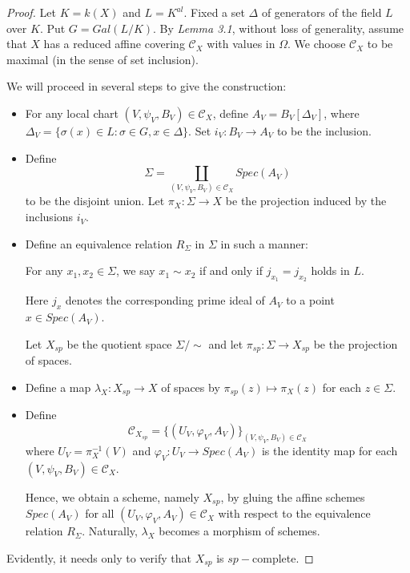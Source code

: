 \documentclass[12pt,twoside,reqno]{amsart}
\theoremstyle{definition}
\numberwithin{equation}{section}
\begin{document}
\begin{proof}
Let $K=k\left( X\right) $ and $L=K^{al}$. Fixed a set $\Delta $ of generators of the field $L$
over $K$. Put $G=Gal\left( L/K\right) .$
By \emph{Lemma 3.1}, without loss of generality, assume that $X$ has a reduced affine covering $\mathcal{C}_{X}$ with values in $\Omega .$
We choose $\mathcal{C}_{X}$ to be maximal (in the sense of set inclusion).

We will proceed in several steps to give the construction:
\begin{itemize}
\item For any local chart $\left( V,\psi
_{V},B_{V}\right) \in \mathcal{C}_{X}$, define $A_{V}=B_{V}\left[ \Delta _{V}\right] $, where
$
\Delta _{V}=\{\sigma \left( x\right) \in L:\sigma \in G,x\in \Delta \}.
$
Set $i_{V}:B_{V}\rightarrow A_{V}$ to be the inclusion.

\item Define
$$
\Sigma =\coprod\limits_{\left( V,\psi _{V},B_{V}\right) \in \mathcal{C}
_{X}}Spec\left( A_{V}\right)
$$
to be the disjoint union. Let $\pi _{X}:\Sigma \rightarrow X$ be the
projection induced by the inclusions $i_{V}$.

\item Define an equivalence relation $R_{\Sigma }$ in $
\Sigma $ in such a manner:

For any $x_{1},x_{2}\in \Sigma $, we say $x_{1}\sim x_{2}$ if and only if $
j_{x_{1}}=j_{x_{2}}$ holds in $L$.

Here $j_{x}$ denotes the corresponding
prime ideal of $A_{V}$ to a point $x\in Spec\left( A_{V}\right) $.

Let $ X_{sp}$ be the quotient space $\Sigma /\sim $ and let $\pi_{sp}:\Sigma \rightarrow  X_{sp}$ be the
projection of spaces.


\item Define a map $\lambda_{X}:X_{sp}\rightarrow X$ of spaces  by
$
\pi_{sp}\left( z\right) \longmapsto \pi _{X}\left( z\right)
$
for each $z\in \Sigma $.

\item Define
\begin{equation*}
\mathcal{C}_{X_{sp}}=\{\left( U_{V},\varphi _{V},A_{V}\right) \}_{\left( V,\psi
_{V},B_{V}\right) \in \mathcal{C}_{X}}
\end{equation*}%
where $U_{V}=\pi _{X}^{-1}\left( V\right) $ and $\varphi
_{V}:U_{V}\rightarrow Spec(A_{V})$ is the identity map for each $\left(
V,\psi _{V},B_{V}\right) \in \mathcal{C}_{X}$.

Hence, we obtain a scheme, namely $X_{sp}$,
by gluing the affine
schemes $Spec\left( A_{V}\right) $ for all $\left( U_{V},\varphi
_{V},A_{V}\right) \in \mathcal{C}_{X}$ with respect to the equivalence
relation $R_{\Sigma }$. Naturally, $\lambda_{X}$ becomes a morphism of schemes.
\end{itemize}
Evidently, it needs only to verify that $X_{sp}$ is $sp-$complete.


\end{proof}
\end{document}
